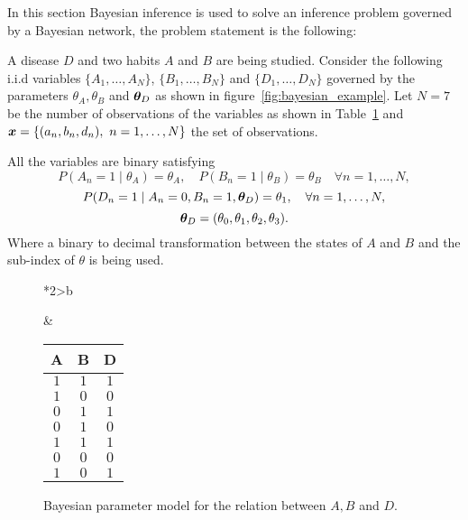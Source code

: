 In this section Bayesian inference is used to solve an inference problem governed by a Bayesian network, the problem statement is the following:

A disease \(D\) and two habits \(A\) and \(B\) are being studied.  Consider the following i.i.d variables \(\{A_{1},\dots, A_{N}\}\), \(\{B_{1},\dots,B_{N}\}\) and \(\{D_{1},\dots, D_{N}\}\) governed by the parameters \(\theta_{A}, \theta_{B}\) and \(\btheta_{D}\) as shown in figure~\ref{fig:bayesian_example}. Let \(N = 7\) be the number of observations of the variables as shown in Table~\ref{tab:bn_ex} and \( \bm{x} = \{(a_n, b_n, d_n),\ n=1,\dots,N\} \) the set of observations.

All the variables are binary satisfying
\[
  P(A_{n} = 1 \mid \theta_{A}) = \theta_{A}, \quad P(B_{n} = 1 \mid \theta_{B}) = \theta_{B} \quad \forall n=1,\dots,N,
\]
\[
  P(D_{n} = 1 \mid A_{n} = 0, B_{n} = 1, \bm{\theta}_{D}) = \theta_{1}, \quad \forall n = 1,\dots,N,
\]
\[
  \bm{\theta}_{D} = ( \theta_{0}, \theta_{1}, \theta_{2},\theta_{3}).
\]
Where a binary to decimal transformation between the states of \(A\) and \(B\) and the sub-index of \(\theta\) is being used.

\begin{figure}[!ht]
  \begin{tabular}{*{2}{>{\centering\arraybackslash}b{}}}
  \centering
  \begin{tikzpicture}[
    node distance=1cm and 0.5cm,
    mynode/.style={draw,circle,text width=0.5cm,align=center}
    ]

    \node[mynode] (d) {\(D_{n}\)};
    \node[mynode, above left=of d] (a) {\(A_{n}\)};
    \node[mynode, above right=of d] (b) {\(B_{n}\)};
    \node[mynode, above=of a] (ta) {\(\theta_{A}\)};
    \node[mynode, above=of b] (tb) {\(\theta_{B}\)};
    \node[mynode, below=of d] (td) {\(\btheta_{D}\)};
    \plate[inner sep=.3cm,xshift=.02cm,yshift=.2cm]  {} {(d)(a)(b)} {\(n= 1\dots N\)}; %
    \path (a) edge[-latex] (d)
    (b) edge[-latex] (d)
    (ta) edge[-latex] (a)
    (tb) edge[-latex] (b)
    (td) edge[-latex] (d)
    ;

  \end{tikzpicture}
    \caption{Bayesian parameter model for the relation between \(A,B\) and \(D\).}\label{fig:bayesian_example}
    &
      \renewcommand{\arraystretch}{1.3}
      \begin{tabular}{ccc}
        \hline
        A & B & D \\ \hline
        \(1\) & \(1\) & \(1\) \\
        \(1\) & \(0\) & \(0\) \\
        \(0\) & \(1\) & \(1\) \\
        \(0\) & \(1\) & \(0\) \\
        \(1\) & \(1\) & \(1\) \\
        \(0\) & \(0\) & \(0\) \\
        \(1\) & \(0\) & \(1\) \\ \hline
  \end{tabular}\label{tab:bn_ex}
\end{tabular}
\end{figure}

